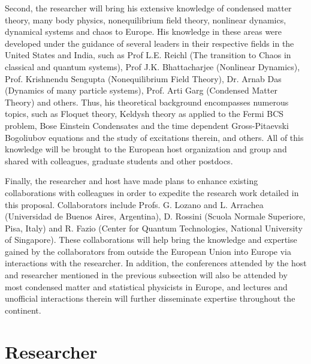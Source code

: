 \documentclass[a4paper,11pt,color]{article}
\begin{document}
Second, the researcher will bring his extensive knowledge of condensed matter theory, many body physics, nonequilibrium field theory, nonlinear dynamics, dynamical systems and chaos to Europe. His knowledge in these areas were developed under the guidance of several leaders in their respective fields in the United States and India, such as Prof L.E. Reichl (The transition to Chaos in classical and quantum systems), Prof J.K. Bhattacharjee (Nonlinear Dynamics), Prof. Krishnendu Sengupta (Nonequilibrium Field Theory), Dr. Arnab Das (Dynamics of many particle systems), Prof. Arti Garg (Condensed Matter Theory) and others. Thus, his theoretical background encompasses numerous topics, such as  Floquet theory, Keldysh theory as applied to the Fermi BCS problem, Bose Einstein Condensates and the time dependent Gross-Pitaevski Bogoliubov equations and the study of excitations therein, and others. All of this knowledge will be brought to the European host organization and group and shared with colleagues, graduate 
students and other postdocs.

Finally, the researcher and host have made plans to enhance existing collaborations with colleagues in order to expedite the research work detailed in this proposal. Collaborators include  Profs. G. Lozano and L. Arrachea (Universidad de Buenos Aires, Argentina), D. Rossini (Scuola Normale Superiore, Pisa, Italy) and R. Fazio (Center for Quantum Technologies, National University of Singapore). These collaborations will help bring the knowledge and expertise gained by the collaborators from outside the European Union into Europe via interactions with the researcher. In addition, the conferences attended by the host and researcher mentioned in the previous subsection will also be attended by most condensed matter and statistical physicists in Europe, and lectures and unofficial interactions therein will further disseminate expertise throughout the continent.

\newpage
\section{Researcher}
\label{sec:researcher}
\end{document}
